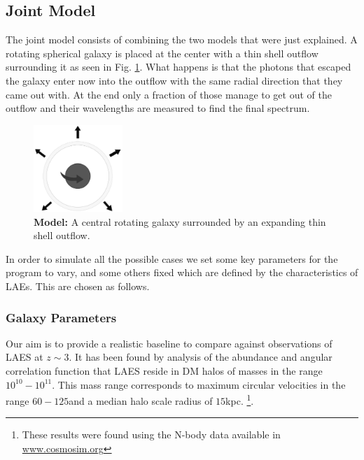 \documentclass{latex/emulateapj}
\begin{document}
\subsection{Joint Model}

The joint model consists of combining the two models that were just explained. A rotating spherical galaxy is placed at the center with a thin shell outflow surrounding it as seen in Fig. \ref{fig:model}. What happens is that the photons that escaped the galaxy enter now into the outflow with the same radial direction that they came out with. At the end only a fraction of those manage to get out of the outflow and their wavelengths are measured to find the final spectrum. \\

\begin{figure}[h!]
\begin{center}
  \includegraphics[width=0.3\textwidth]{./figures/model.png}
\end{center}
\caption{\textbf{Model:} A central rotating galaxy surrounded by an expanding thin shell outflow.
\label{fig:model}}
\end{figure}

In order to simulate all the possible cases we set some key parameters for the program to vary, and some others fixed which are defined by the characteristics of LAEs. This are chosen as follows.\\

\subsubsection{Galaxy Parameters}

Our aim is to provide a realistic baseline to compare against observations of LAES at $z\sim 3$. It has been found by analysis of the abundance and angular correlation function that LAES reside in DM halos of masses in the range $10^{10}-10^{11}$\Msun \cite{WalkerSoler2012}. This mass range corresponds to maximum circular velocities in the range $60-125$\kms and a median halo scale radius of $15$kpc.  \footnote{These results were found using the  N-body data available in \url{www.cosmosim.org}}. \\
\end{document}
